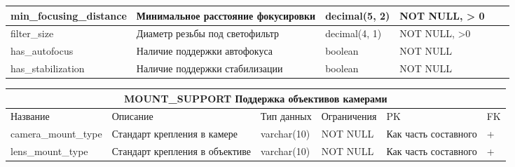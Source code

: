 \documentclass{article}
\begin{document}
\begin{tabular}{ |p{4cm}|p{4cm}|p{2.5cm}|p{3.5cm}|p{2cm}|p{1cm}| }
\hline
min\_focusing\_distance             &   %
Минимальное расстояние фокусировки  &   %
decimal(5, 2)                       &   %
NOT NULL, \linebreak
> 0                                 &   %
                                    &   %
                                    \\  %
\hline
filter\_size                        &   %
Диаметр резьбы под светофильтр      &   %
decimal(4, 1)                       &   %
NOT NULL, \linebreak
>0                                  &   %
                                    &   %
                                    \\  %
\hline
has\_autofocus                      &   %
Наличие поддержки автофокуса        &   %
boolean                             &   %
NOT NULL                            &   %
                                    &   %
                                    \\  %
\hline
has\_stabilization                  &   %
Наличие поддержки стабилизации      &   %
boolean                             &   %
NOT NULL                            &   %
                                    &   %
                                    \\  %
\hline
\end{tabular}

\newpage

\begin{tabular}{ |p{4cm}|p{4cm}|p{2.5cm}|p{3.5cm}|p{2cm}|p{1cm}| }
\hline
\multicolumn{6}{|c|}{MOUNT\_SUPPORT Поддержка объективов камерами} \\
\hline
Название & Описание & Тип данных & Ограничения & PK & FK\\
\hline
camera\_mount\_type                 &   %
Стандарт крепления в камере         &   %
varchar(10)                         &   %
NOT NULL                            &   %
Как часть составного                &   %
 +                                  \\  %
\hline
lens\_mount\_type                   &   %
Стандарт крепления в объективе      &   %
varchar(10)                         &   %
NOT NULL                            &   %
Как часть составного                &   %
 +                                  \\  %
\hline
\end{tabular}
\end{document}
